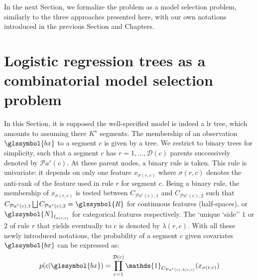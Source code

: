 In the next Section, we formalize the problem as a model selection problem, similarly to the three approaches presented here, with our own notations introduced in the previous Section and Chapters.


\section{Logistic regression trees as a combinatorial model selection problem} \label{sec:model_selec_tree}

In this Section, it is supposed the well-specified model is indeed a \gls{lr} tree, which amounts to assuming there $K^\star$ segments. The membership of an observation $\glssymbol{bx}$ to a segment $c$ is given by a tree. We restrict to binary trees for simplicity, such that a segment $c$ has $r = 1, \dots, \mathcal{D}(c)$ parents successively denoted by $\mathcal{P}a^r(c)$. At these parent nodes, a binary rule is taken. This rule is univariate: it depends on only one feature $x_{\sigma(r,c)}$ where $\sigma(r,c)$ denotes the anti-rank of the feature used in rule $r$ for segment $c$. Being a binary rule, the membership of $x_{\sigma(r,c)}$ is tested between $C_{\mathcal{P}a^r(c),1}$ and $C_{\mathcal{P}a^r(c),2}$ such that $C_{\mathcal{P}a^r(c),1} \bigsqcup C_{\mathcal{P}a^r(c),2} =\glssymbol{R}$ for continuous features (half-spaces), or $\glssymbol{N}_{l_{\sigma(r,c)}}$ for categorical features respectively. The `unique `side'' $1$ or $2$ of rule $r$ that yields eventually to $c$ is denoted by $\lambda(r,c)$. With all these newly introduced notations, the probability of a segment $c$ given covariates $\glssymbol{bx}$ can be expressed as:
\begin{equation} \label{eq:tree}
p( c | \glssymbol{bx}) = \prod_{r = 1}^{\mathcal{D}(c)} \mathds{1}_{C_{\mathcal{P}a^r(c),\lambda(r,c)}} (x_{\sigma(r,c)})
\end{equation}
